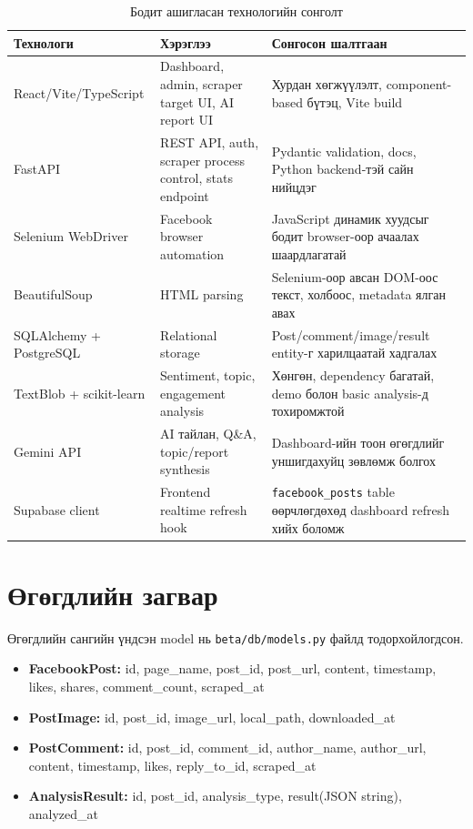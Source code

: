 \documentclass[
12pt,
oneside,
english,
onehalfspacing,
nolistspacing,
headsepline,
]{MUST-Thesis}
\begin{document}
\begin{table}[H]
\centering
\caption{Бодит ашигласан технологийн сонголт}
\small
\renewcommand{\arraystretch}{1.28}
\begin{adjustbox}{max width=\textwidth}
\begin{tabular}{|L{3.0cm}|L{5.2cm}|L{5.2cm}|}
\hline
{}\textbf{Технологи} & \textbf{Хэрэглээ} & \textbf{Сонгосон шалтгаан} \\
\hline
React/Vite/\newline TypeScript & Dashboard, admin, scraper target UI, AI report UI & Хурдан хөгжүүлэлт, component-based бүтэц, Vite build \\
\hline
FastAPI & REST API, auth, scraper process control, stats endpoint & Pydantic validation, docs, Python backend-тэй сайн нийцдэг \\
\hline
Selenium WebDriver & Facebook browser automation & JavaScript динамик хуудсыг бодит browser-оор ачаалах шаардлагатай \\
\hline
BeautifulSoup & HTML parsing & Selenium-оор авсан DOM-оос текст, холбоос, metadata ялган авах \\
\hline
SQLAlchemy + PostgreSQL & Relational storage & Post/comment/image/result entity-г харилцаатай хадгалах \\
\hline
TextBlob + scikit-learn & Sentiment, topic, engagement analysis & Хөнгөн, dependency багатай, demo болон basic analysis-д тохиромжтой \\
\hline
Gemini API & AI тайлан, Q\&A, topic/report synthesis & Dashboard-ийн тоон өгөгдлийг уншигдахуйц зөвлөмж болгох \\
\hline
Supabase client & Frontend realtime refresh hook & \texttt{facebook\_posts} table өөрчлөгдөхөд dashboard refresh хийх боломж \\
\hline
\end{tabular}
\end{adjustbox}
\normalsize
\end{table}

\section{Өгөгдлийн загвар}

Өгөгдлийн сангийн үндсэн model нь \texttt{beta/db/models.py} файлд тодорхойлогдсон.

\begin{itemize}
    \item \textbf{FacebookPost:} id, page\_name, post\_id, post\_url, content, timestamp, likes, shares, comment\_count, scraped\_at
    \item \textbf{PostImage:} id, post\_id, image\_url, local\_path, downloaded\_at
    \item \textbf{PostComment:} id, post\_id, comment\_id, author\_name, author\_url, content, timestamp, likes, reply\_to\_id, scraped\_at
    \item \textbf{AnalysisResult:} id, post\_id, analysis\_type, result(JSON string), analyzed\_at
\end{itemize}
\end{document}
